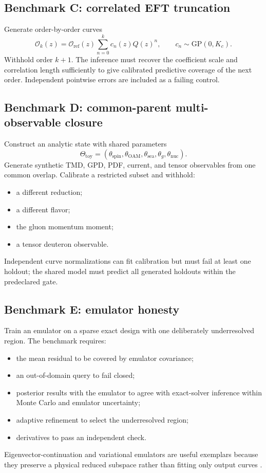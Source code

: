 \documentclass[11pt]{article}
\newcommand{\cO}{\mathcal O}
\newcommand{\GP}{\ensuremath{\mathrm{GP}}}
\begin{document}
\subsection{Benchmark C: correlated EFT truncation}

Generate order-by-order curves
\begin{equation}
 \cO_k(z)
 =
 \cO_{\mathrm{ref}}(z)
 \sum_{n=0}^{k}
 c_n(z)Q(z)^n,
 \qquad
 c_n\sim\GP(0,K_c).
 \label{eq:benchmark-c}
\end{equation}
Withhold order \(k+1\).  The inference must recover the coefficient scale and
correlation length sufficiently to give calibrated predictive coverage of the
next order.  Independent pointwise errors are included as a failing control.

\subsection{Benchmark D: common-parent multi-observable closure}

Construct an analytic state with shared parameters
\[
 \Theta_{\mathrm{toy}}
 =
 (\theta_{\mathrm{spin}},
  \theta_{\mathrm{OAM}},
  \theta_{\mathrm{sea}},
  \theta_g,
  \theta_{\mathrm{nuc}}).
\]
Generate synthetic TMD, GPD, PDF, current, and tensor observables from one
common overlap.  Calibrate a restricted subset and withhold:
\begin{itemize}
\item a different reduction;
\item a different flavor;
\item the gluon momentum moment;
\item a tensor deuteron observable.
\end{itemize}
Independent curve normalizations can fit calibration but must fail at least
one holdout; the shared model must predict all generated holdouts within the
predeclared gate.

\subsection{Benchmark E: emulator honesty}

Train an emulator on a sparse exact design with one deliberately underresolved
region.  The benchmark requires:
\begin{itemize}
\item the mean residual to be covered by emulator covariance;
\item an out-of-domain query to fail closed;
\item posterior results with the emulator to agree with exact-solver inference
within Monte Carlo and emulator uncertainty;
\item adaptive refinement to select the underresolved region;
\item derivatives to pass an independent check.
\end{itemize}
Eigenvector-continuation and variational emulators are useful exemplars because
they preserve a physical reduced subspace rather than fitting only output
curves \cite{Frame2018,ZhangFurnstahl2022}.
\end{document}
